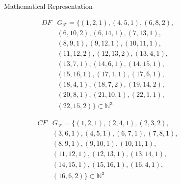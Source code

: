 \begin{figure}[p]
\begin{blackbox}{Mathematical Representation}
    \centering
    \begin{minipage}{0.329\textwidth}
        \begin{graybox}
            \scriptsize
            \setlength{\abovedisplayskip}{0pt}
            \setlength{\belowdisplayskip}{0pt}
            \vspace{-0.5em}
            \begin{align*}
                DF&G_\mathcal F=\{(1,2,1),(4,5,1),(6,8,2),\\[-0.5em]
                  &(6,10,2),(6,14,1),(7,13,1),\\[-0.5em]
                  &(8,9,1),(9,12,1),(10,11,1),\\[-0.5em]
                  &(11,12,2),(12,13,2),(13,4,1),\\[-0.5em]
                  &(13,7,1),(14,6,1),(14,15,1),\\[-0.5em]
                  &(15,16,1),(17,1,1),(17,6,1),\\[-0.5em]
                  &(18,4,1),(18,7,2),(19,14,2),\\[-0.5em]
                  &(20,8,1),(21,10,1),(22,1,1),\\[-0.5em]
                  &(22,15,2)\}\subset\mathbb N^3
            \end{align*}
        \end{graybox}
    \end{minipage}
    \begin{minipage}{0.329\textwidth}
        \begin{graybox}
            \scriptsize
            \setlength{\abovedisplayskip}{0pt}
            \setlength{\belowdisplayskip}{0pt}
            \vspace{-0.5em}
            \begin{align*}
                CF&G_\mathcal F=\{(1,2,1),(2,4,1),(2,3,2),\\[-0.5em]
                  &(3,6,1),(4,5,1),(6,7,1),(7,8,1),\\[-0.5em]
                  &(8,9,1),(9,10,1),(10,11,1),\\[-0.5em]
                  &(11,12,1),(12,13,1),(13,14,1),\\[-0.5em]
                  &(14,15,1),(15,16,1),(16,4,1),\\[-0.5em]
                  &(16,6,2)\}\subset\mathbb N^3
            \end{align*}


\end{graybox}
\end{minipage}
\end{blackbox}
\end{figure}
